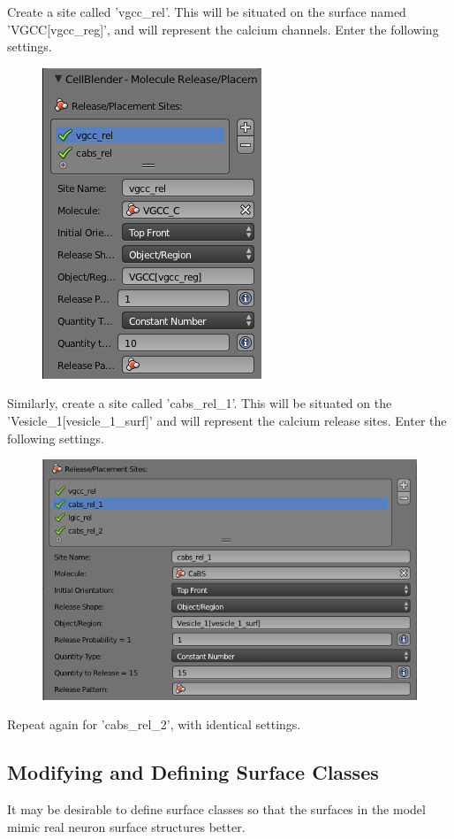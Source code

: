 \documentclass[twoside,a4paper]{refart}
\begin{document}
Create a site called 'vgcc\_rel'. This will be situated on the surface named 'VGCC[vgcc\_reg]', and will represent the calcium channels. Enter the following settings.
    \begin{figure}[H]
        \includegraphics[scale=0.5]{settings1.png}
    \end{figure}


Similarly, create a site called 'cabs\_rel\_1'. This will be situated on the 'Vesicle\_1[vesicle\_1\_surf]' and will represent the calcium release sites. Enter the following settings.
    \begin{figure}[H]
        \includegraphics[scale=0.5]{settings2.png}
    \end{figure}

Repeat again for 'cabs\_rel\_2', with identical settings.

\subsection{Modifying and Defining Surface Classes}
It may be desirable to define surface classes so that the surfaces in the model mimic real neuron surface structures better. 
\end{document}
